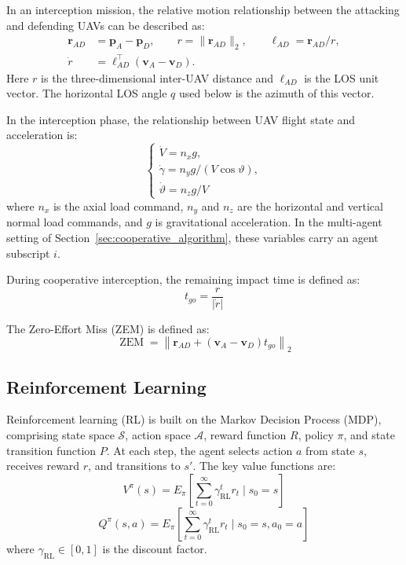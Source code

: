\documentclass[lettersize,journal]{IEEEtran}
\begin{document}
In an interception mission, the relative motion relationship between the attacking and
defending UAVs can be described as:
\begin{equation}
\label{gongfang}
\begin{split}
\mathbf r_{AD}&=\mathbf p_A-\mathbf p_D,\qquad
r=\|\mathbf r_{AD}\|_2,\qquad
\boldsymbol{\ell}_{AD}=\mathbf r_{AD}/r,\\
\dot r&=\boldsymbol{\ell}_{AD}^{\top}(\mathbf v_A-\mathbf v_D).
\end{split}
\end{equation}
Here \(r\) is the three-dimensional inter-UAV distance and
\(\boldsymbol{\ell}_{AD}\) is the LOS unit vector. The horizontal LOS angle
\(q\) used below is the azimuth of this vector.

In the interception phase, the relationship between UAV flight state and acceleration is:
\begin{equation}
\label{guozai}
\left\{\begin{matrix}
\dot{V}=n_xg,\\
\dot{\gamma}=n_yg/(V\cos\vartheta),\\
\dot{\vartheta}=n_zg/V
\end{matrix}\right.
\end{equation}
where \(n_x\) is the axial load command, \(n_y\) and \(n_z\) are the
horizontal and vertical normal load commands, and \(g\) is gravitational
acceleration.
In the multi-agent setting of Section~\ref{sec:cooperative_algorithm}, these variables carry
an agent subscript $i$.

During cooperative interception, the remaining impact time is defined as:
\begin{equation}
\label{shijian}
t_{go}=\frac{r}{\left|\dot{r}\right|}
\end{equation}

The Zero-Effort Miss (ZEM) is defined as:
\begin{equation}
\label{ZEM}
\operatorname{ZEM}
=\left\|\mathbf r_{AD}
+(\mathbf v_A-\mathbf v_D)t_{go}\right\|_2
\end{equation}

\subsection{Reinforcement Learning}

Reinforcement learning (RL) is built on the Markov Decision Process (MDP), comprising state
space $\mathcal{S}$, action space $\mathcal{A}$, reward function $R$, policy $\pi$, and state
transition function $P$.
At each step, the agent selects action $a$ from state $s$, receives reward $r$, and
transitions to $s'$.
The key value functions are:
\begin{equation}
\label{RLV}
V^{\pi}(s)=E_{\pi}\left[\sum_{t=0}^{\infty}\gamma_{\mathrm{RL}}^{t}r_{t}\mid s_{0}=s\right]
\end{equation}
\begin{equation}
\label{RLQ}
Q^{\pi}(s,a)=E_{\pi}\left[\sum_{t=0}^{\infty}\gamma_{\mathrm{RL}}^{t}r_{t}\mid s_{0}=s,a_{0}=a\right]
\end{equation}
where $\gamma_{\mathrm{RL}}\in[0,1]$ is the discount factor.
\end{document}

